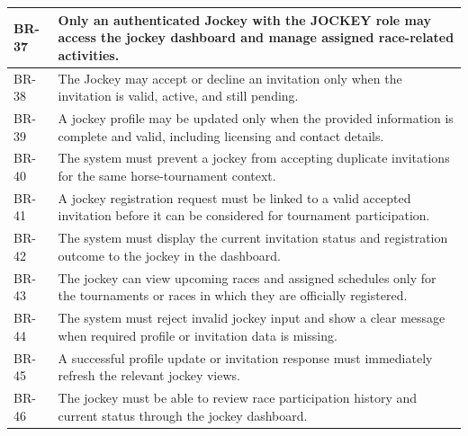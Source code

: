 \vspace{1em}

\begin{table}[H]
    \centering
    \begin{tabular}{|l|p{12cm}|}
        \hline
        BR-37 & Only an authenticated Jockey with the JOCKEY role may access the jockey dashboard and manage assigned race-related activities. \\ 
        \hline
        BR-38 & The Jockey may accept or decline an invitation only when the invitation is valid, active, and still pending. \\ 
        \hline
        BR-39 & A jockey profile may be updated only when the provided information is complete and valid, including licensing and contact details. \\ 
        \hline
        BR-40 & The system must prevent a jockey from accepting duplicate invitations for the same horse-tournament context. \\ 
        \hline
        BR-41 & A jockey registration request must be linked to a valid accepted invitation before it can be considered for tournament participation. \\ 
        \hline
        BR-42 & The system must display the current invitation status and registration outcome to the jockey in the dashboard. \\ 
        \hline
        BR-43 & The jockey can view upcoming races and assigned schedules only for the tournaments or races in which they are officially registered. \\ 
        \hline
        BR-44 & The system must reject invalid jockey input and show a clear message when required profile or invitation data is missing. \\ 
        \hline
        BR-45 & A successful profile update or invitation response must immediately refresh the relevant jockey views. \\ 
        \hline
        BR-46 & The jockey must be able to review race participation history and current status through the jockey dashboard. \\ 
        \hline
    \end{tabular}
    \label{tab:jockey_business_rules}
\end{table}

\vspace{1em}

